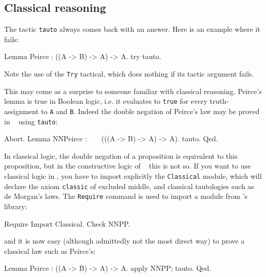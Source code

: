\documentclass[11pt,a4paper]{book}
\begin{document}
\subsection{Classical reasoning}

The tactic \verb:tauto: always comes back with an answer. Here is an example where it 
fails:
\begin{coq_example}
Lemma Peirce : ((A -> B) -> A) -> A.
try tauto.
\end{coq_example}

Note the use of the \verb:Try: tactical, which does nothing if its tactic
argument fails.

This may come as a surprise to someone familiar with classical reasoning. 
Peirce's lemma is true in Boolean logic, i.e. it evaluates to \verb:true: for 
every truth-assignment to \verb:A: and \verb:B:. Indeed the double negation
of Peirce's law may be proved in \Coq~ using \verb:tauto::
\begin{coq_example}
Abort.
Lemma NNPeirce : ~ ~ (((A -> B) -> A) -> A).
tauto.
Qed.
\end{coq_example}

In classical logic, the double negation of a proposition is equivalent to this 
proposition, but in the constructive logic of \Coq~ this is not so. If you 
want to use classical logic in \Coq, you have to import explicitly the
\verb:Classical: module, which will declare the axiom \verb:classic:
of excluded middle, and classical tautologies such as de Morgan's laws.
The \verb:Require: command is used to import a module from \Coq's library:
\begin{coq_example}
Require Import Classical.
Check NNPP.
\end{coq_example}

and it is now easy (although admittedly not the most direct way) to prove
a classical law such as Peirce's:
\begin{coq_example}
Lemma Peirce : ((A -> B) -> A) -> A.
apply NNPP; tauto.
Qed.
\end{coq_example}
\end{document}
